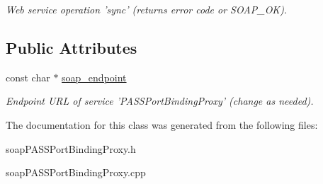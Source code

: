 \begin{DoxyCompactItemize}
\begin{DoxyCompactList}\small\item\em Web service operation 'sync' (returns error code or SOAP\_\-OK). \item\end{DoxyCompactList}\end{DoxyCompactItemize}
\subsection*{Public Attributes}
\begin{DoxyCompactItemize}
\item 
\hypertarget{classPASSPortBindingProxy_a29aa4e200643828329af06e23285edee}{
const char $\ast$ \hyperlink{classPASSPortBindingProxy_a29aa4e200643828329af06e23285edee}{soap\_\-endpoint}}
\label{classPASSPortBindingProxy_a29aa4e200643828329af06e23285edee}

\begin{DoxyCompactList}\small\item\em Endpoint URL of service 'PASSPortBindingProxy' (change as needed). \item\end{DoxyCompactList}\end{DoxyCompactItemize}


The documentation for this class was generated from the following files:\begin{DoxyCompactItemize}
\item 
soapPASSPortBindingProxy.h\item 
soapPASSPortBindingProxy.cpp\end{DoxyCompactItemize}
